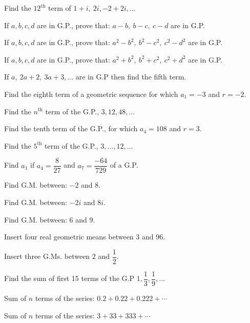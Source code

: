 \documentclass[11pt,a4paper]{article}
\begin{document}
\begin{shortlist}
\item Find the $12^{\text{th}}$ term of $1+i,\ 2i,-2+2i,\ldots$

\item If $a,b,c,d$ are in G.P., prove that: $a-b,\ b-c,\ c-d$ are in G.P.

\item If $a,b,c,d$ are in G.P., prove that: $a^2-b^2,\ b^2-c^2,\ c^2-d^2$ are in G.P.

\item If $a,b,c,d$ are in G.P., prove that: $a^2+b^2,\ b^2+c^2,\ c^2+d^2$ are in G.P.

\item If $a,\ 2a+2,\ 3a+3,\ldots$ are in G.P then find the fifth term.

\item Find the eighth term of a geometric sequence for which $a_1=-3$ and $r=-2$.

\item Find the $n^{\text{th}}$ term of the G.P., $3,12,48,\ldots$

\item Find the tenth term of the G.P., for which $a_4=108$ and $r=3$.

\item Find the $5^{\text{th}}$ term of the G.P., $3,\ldots,12,\ldots$

\item Find $a_1$ if $a_4=\dfrac{8}{27}$ and $a_7=\dfrac{-64}{729}$ of a G.P.

\item Find G.M. between: $-2$ and $8$.

\item Find G.M. between: $-2i$ and $8i$.

\item Find G.M. between: $6$ and $9$.

\item Insert four real geometric means between $3$ and $96$.

\item Insert three G.Ms. between $2$ and $\dfrac{1}{2}$.

\item Find the sum of first 15 terms of the G.P $1,\dfrac{1}{3},\dfrac{1}{9},\ldots$

\item Sum of $n$ terms of the series: $0.2+0.22+0.222+\cdots$

\item Sum of $n$ terms of the series: $3+33+333+\cdots$


\end{shortlist}
\end{document}
